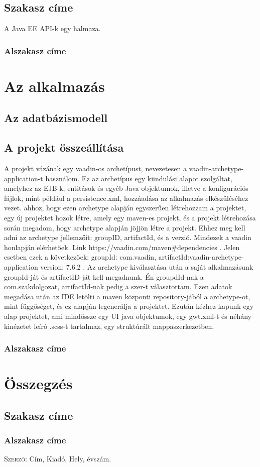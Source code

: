 \documentclass[centeredchapter]{thesis-ekf}
\theoremstyle{definition}
\theoremstyle{remark}
\begin{document}
\section{Szakasz címe}

A Java EE API-k egy halmaza.

\subsection{Alszakasz címe}

\chapter{Az alkalmazás}

\section{Az adatbázismodell}

\section{A projekt összeállítása}

A projekt vázának egy vaadin-os archetípust, nevezetesen a vaadin-archetype-application-t használom. Ez az archetípus egy kiindulási alapot szolgáltat, amelyhez az EJB-k, entitások és egyéb Java objektumok, illetve a konfigurációs fájlok, mint például a persistence.xml, hozzáadása az alkalmazás elkészüléséhez vezet.
ahhoz, hogy ezen archetype alapján egyszerűen létrehozzam a projektet, egy új projektet hozok létre, amely egy maven-es projekt, és a projekt létrehozása során megadom, hogy archetype alapján jöjjön létre a projekt. Ehhez meg kell adni az archetype jellemzőit: groupID, artifactId, és a verzió. Mindezek a vaadin honlapján elérhetőek. Link https://vaadin.com/maven#dependencies . Jelen esetben ezek a következőek: groupId: com.vaadin, artifactId:vaadin-archetype-application version: 7.6.2 . Az archetype kiválasztása után a saját alkalmazásunk groupId-ját és artifactID-ját kell megadnunk. Én groupdId-nak a com.szakdolgozat, artifactId-nak pedig a szer-t választottam. Ezen adatok megadása után az IDE letölti a maven központi repository-jából a archetype-ot, mint függőséget, és ez alapján legenerálja a projektet. Ezután kézhez kapunk egy alap projektet, ami mindössze egy UI java objektumok, egy gwt.xml-t és néhány kinézetet leíró .scss-t tartalmaz, egy struktúrált mappaszerkezetben.

\subsection{Alszakasz címe}

\chapter{Összegzés}

\section{Szakasz címe}

\subsection{Alszakasz címe}


\begin{thebibliography}{1}
 \textsc{Szerző}: Cím, Kiadó, Hely, évszám.
\end{thebibliography}
\end{document}
